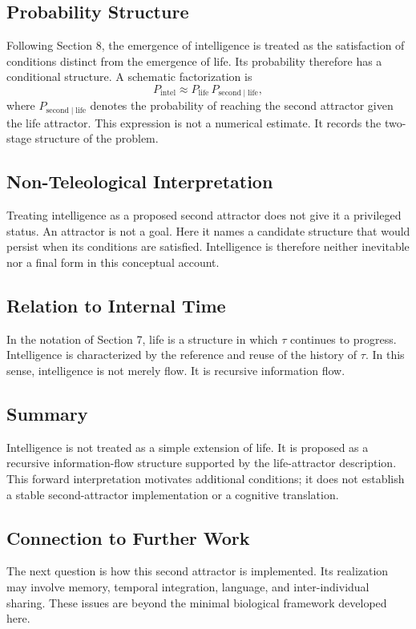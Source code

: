 \subsection{Probability Structure}

Following Section 8, the emergence of intelligence is treated as the satisfaction of conditions distinct from the emergence of life. Its probability therefore has a conditional structure. A schematic factorization is
\begin{equation}
  P_{\mathrm{intel}} \approx P_{\mathrm{life}}\,P_{\mathrm{second}\mid\mathrm{life}},
\end{equation}
where \(P_{\mathrm{second}\mid\mathrm{life}}\) denotes the probability of reaching the second attractor given the life attractor. This expression is not a numerical estimate. It records the two-stage structure of the problem.

\subsection{Non-Teleological Interpretation}

Treating intelligence as a proposed second attractor does not give it a privileged status. An attractor is not a goal. Here it names a candidate structure that would persist when its conditions are satisfied. Intelligence is therefore neither inevitable nor a final form in this conceptual account.

\subsection{Relation to Internal Time}

In the notation of Section 7, life is a structure in which \(\tau\) continues to progress. Intelligence is characterized by the reference and reuse of the history of \(\tau\). In this sense, intelligence is not merely flow. It is recursive information flow.

\subsection{Summary}

Intelligence is not treated as a simple extension of life. It is proposed as a recursive information-flow structure supported by the life-attractor description. This forward interpretation motivates additional conditions; it does not establish a stable second-attractor implementation or a cognitive translation.

\subsection{Connection to Further Work}

The next question is how this second attractor is implemented. Its realization may involve memory, temporal integration, language, and inter-individual sharing. These issues are beyond the minimal biological framework developed here.
